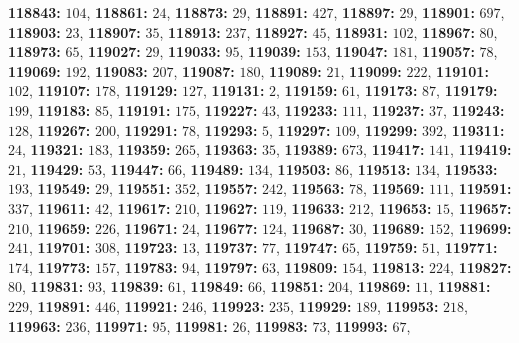 \textsf{\bfseries 118843:} $104$, \textsf{\bfseries 118861:} $24$, \textsf{\bfseries 118873:} $29$, \textsf{\bfseries 118891:} $427$, \textsf{\bfseries 118897:} $29$, \textsf{\bfseries 118901:} $697$, \textsf{\bfseries 118903:} $23$, \textsf{\bfseries 118907:} $35$, \textsf{\bfseries 118913:} $237$, \textsf{\bfseries 118927:} $45$, \textsf{\bfseries 118931:} $102$, \textsf{\bfseries 118967:} $80$, \textsf{\bfseries 118973:} $65$, \textsf{\bfseries 119027:} $29$, \textsf{\bfseries 119033:} $95$, \textsf{\bfseries 119039:} $153$, \textsf{\bfseries 119047:} $181$, \textsf{\bfseries 119057:} $78$, \textsf{\bfseries 119069:} $192$, \textsf{\bfseries 119083:} $207$, \textsf{\bfseries 119087:} $180$, \textsf{\bfseries 119089:} $21$, \textsf{\bfseries 119099:} $222$, \textsf{\bfseries 119101:} $102$, \textsf{\bfseries 119107:} $178$, \textsf{\bfseries 119129:} $127$, \textsf{\bfseries 119131:} $2$, \textsf{\bfseries 119159:} $61$, \textsf{\bfseries 119173:} $87$, \textsf{\bfseries 119179:} $199$, \textsf{\bfseries 119183:} $85$, \textsf{\bfseries 119191:} $175$, \textsf{\bfseries 119227:} $43$, \textsf{\bfseries 119233:} $111$, \textsf{\bfseries 119237:} $37$, \textsf{\bfseries 119243:} $128$, \textsf{\bfseries 119267:} $200$, \textsf{\bfseries 119291:} $78$, \textsf{\bfseries 119293:} $5$, \textsf{\bfseries 119297:} $109$, \textsf{\bfseries 119299:} $392$, \textsf{\bfseries 119311:} $24$, \textsf{\bfseries 119321:} $183$, \textsf{\bfseries 119359:} $265$, \textsf{\bfseries 119363:} $35$, \textsf{\bfseries 119389:} $673$, \textsf{\bfseries 119417:} $141$, \textsf{\bfseries 119419:} $21$, \textsf{\bfseries 119429:} $53$, \textsf{\bfseries 119447:} $66$, \textsf{\bfseries 119489:} $134$, \textsf{\bfseries 119503:} $86$, \textsf{\bfseries 119513:} $134$, \textsf{\bfseries 119533:} $193$, \textsf{\bfseries 119549:} $29$, \textsf{\bfseries 119551:} $352$, \textsf{\bfseries 119557:} $242$, \textsf{\bfseries 119563:} $78$, \textsf{\bfseries 119569:} $111$, \textsf{\bfseries 119591:} $337$, \textsf{\bfseries 119611:} $42$, \textsf{\bfseries 119617:} $210$, \textsf{\bfseries 119627:} $119$, \textsf{\bfseries 119633:} $212$, \textsf{\bfseries 119653:} $15$, \textsf{\bfseries 119657:} $210$, \textsf{\bfseries 119659:} $226$, \textsf{\bfseries 119671:} $24$, \textsf{\bfseries 119677:} $124$, \textsf{\bfseries 119687:} $30$, \textsf{\bfseries 119689:} $152$, \textsf{\bfseries 119699:} $241$, \textsf{\bfseries 119701:} $308$, \textsf{\bfseries 119723:} $13$, \textsf{\bfseries 119737:} $77$, \textsf{\bfseries 119747:} $65$, \textsf{\bfseries 119759:} $51$, \textsf{\bfseries 119771:} $174$, \textsf{\bfseries 119773:} $157$, \textsf{\bfseries 119783:} $94$, \textsf{\bfseries 119797:} $63$, \textsf{\bfseries 119809:} $154$, \textsf{\bfseries 119813:} $224$, \textsf{\bfseries 119827:} $80$, \textsf{\bfseries 119831:} $93$, \textsf{\bfseries 119839:} $61$, \textsf{\bfseries 119849:} $66$, \textsf{\bfseries 119851:} $204$, \textsf{\bfseries 119869:} $11$, \textsf{\bfseries 119881:} $229$, \textsf{\bfseries 119891:} $446$, \textsf{\bfseries 119921:} $246$, \textsf{\bfseries 119923:} $235$, \textsf{\bfseries 119929:} $189$, \textsf{\bfseries 119953:} $218$, \textsf{\bfseries 119963:} $236$, \textsf{\bfseries 119971:} $95$, \textsf{\bfseries 119981:} $26$, \textsf{\bfseries 119983:} $73$, \textsf{\bfseries 119993:} $67$, 
